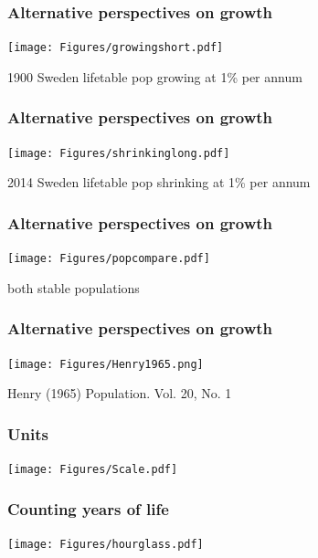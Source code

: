 \documentclass[20pt]{beamer}
\begin{document}

\begin{frame}
\frametitle{Alternative perspectives on growth}
\vspace{-2em}
\begin{center}
\texttt{[image: Figures/growingshort.pdf]}
\end{center}
\small{
1900 Sweden lifetable pop growing at 1\% per annum
}
\end{frame}


\begin{frame}
\frametitle{Alternative perspectives on growth}
\vspace{-2em}
\begin{center}
\texttt{[image: Figures/shrinkinglong.pdf]}
\end{center}
\small{
2014 Sweden lifetable pop shrinking at 1\% per annum
}
\end{frame}


\begin{frame}
\frametitle{Alternative perspectives on growth}
\vspace{-2em}
\begin{center}
\texttt{[image: Figures/popcompare.pdf]}
\end{center}
\small{
both stable populations
}
\end{frame}


\begin{frame}
\frametitle{Alternative perspectives on growth}
\vspace{-2em}
\begin{center}
\texttt{[image: Figures/Henry1965.png]}
\end{center}
Henry (1965) Population. Vol. 20, No. 1 
\end{frame}


\begin{frame}
\frametitle{Units}
\begin{center}
\texttt{[image: Figures/Scale.pdf]}
\end{center}
\end{frame}


\begin{frame}
\frametitle{Counting years of life}
\begin{center}
\texttt{[image: Figures/hourglass.pdf]}
\end{center}
\end{frame}
\end{document}

